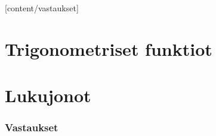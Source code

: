 [content/vastaukset]

\part{Trigonometriset funktiot}


\part{Lukujonot}



\liitetyyli



\section{Vastaukset} 
